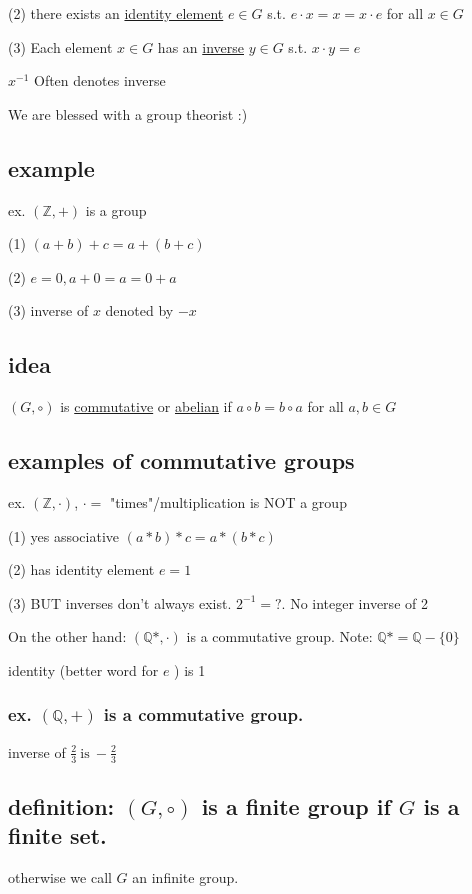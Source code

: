 \documentclass[class=scrartcl, crop=false]{standalone}
\begin{document}
(2) there exists an \underline{identity element} $e \in G$ s.t. $e \cdot x = x = x \cdot e$ for all $x \in G$

(3) Each element  $x \in G$ has an \underline{inverse} $y \in G$ s.t. $x \cdot y = e$

$x^{-1}$ Often denotes inverse

We are blessed with a group theorist :)

\subsection*{example}
ex. $(\mathbb{Z}, +)$ is a group

(1) $(a + b) + c = a + (b + c)$

(2) $e = 0, a + 0 = a = 0 + a$

(3) inverse of $x$ denoted by  $-x$ 

\subsection*{idea}
$(G, \circ)$ is \underline{commutative} or \underline{abelian} if $a \circ b = b \circ a$ for all $a, b \in G$

\subsection*{examples of commutative groups}

ex. $(\mathbb{Z}, \cdot)$, $\cdot = $ "times"/multiplication is NOT a group

(1) yes associative $(a * b) * c = a * (b * c)$

(2) has identity element $e = 1$ 

(3) BUT inverses don't always exist. $2^{-1} = ?$. No integer inverse of 2

On the other hand: $(\mathbb{Q}*, \cdot)$ is a commutative group. Note: $\mathbb{Q}* = \mathbb{Q} - \{0\}$

identity (better word for  $e$ ) is 1

\subsubsection*{ex. $(\mathbb{Q}, +)$ is a commutative group.}
inverse of $\frac{2}{3} \ \text{is} \  -\frac{2}{3}$

\subsection*{definition: $(G, \circ)$ is a finite group if $G$ is a finite set.}
otherwise we call $G$ an infinite group.
\end{document}
